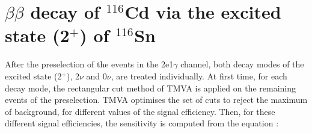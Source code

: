 \documentclass[main.tex]{subfiles}
\begin{document}


\FloatBarrier


\section{$\beta\beta$ decay of $^{\text{116}}$Cd via the excited state (2$^+$) of $^{\text{116}}$Sn}\label{sec:Result2PLUS}


\NI After the preselection of the events in the 2e1$\gamma$ channel, both decay modes of the excited state (2$^+$), 2$\nu$ and 0$\nu$, are treated individually. At first time, for each decay mode, the rectangular cut method of TMVA is applied on the remaining events of the preselection. TMVA optimises the set of cuts to reject the maximum of background, for different values of the signal efficiency. Then, for these different signal efficiencies, the sensitivity is computed from the equation : 
\end{document}
